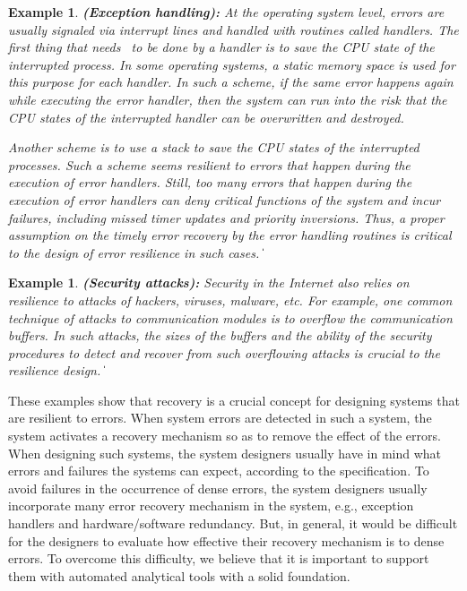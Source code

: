 \documentclass[times,10pt,twocolumn]{article}
\newtheorem{example}[theorem]{Example}
\newcommand\qed{\hfill\ensuremath{\Box}}
\def\qed{\ifmmode\|\else{\unskip\nobreak\hfil
\penalty50\hskip1em\null\nobreak\hfil$\blacksquare$
\parfillskip=0pt\finalhyphendemerits=0\endgraf}\fi}
\begin{document}
\begin{example} {\bf (Exception handling):} 
\label{exmp.ehan} 
At the operating system level, errors are usually signaled via 
interrupt lines and handled with routines called handlers.  
The first thing that needs~\label{reply2.needs.to} to be done by a handler is to save 
the CPU state of the interrupted process. 
In some operating systems, a static memory space is used for 
this purpose for each handler. 
In such a scheme, if the same error happens again while executing 
the error handler, then the system can run into the risk that 
the CPU states of the interrupted handler can be overwritten and 
destroyed. 

Another scheme is to use a stack to save the CPU states of the interrupted 
processes.  
Such a scheme seems resilient to errors that happen during\label{reply1.durin1} the execution of 
error handlers.  
Still, too many errors that happen during the execution of error handlers
can deny critical functions\label{reply2.delay.timely} of the system and 
incur failures, including missed timer updates and priority inversions.   
Thus, a proper assumption on the timely error recovery by 
the error handling routines is critical to the design of 
error resilience in such cases.  
\qed 
\end{example} 

\begin{example} {\bf (Security attacks):} 
\label{exmp.satt}
Security in the Internet also relies on resilience to attacks 
of hackers, viruses,\label{reply2.viruses} malware, etc.  
For example, one common technique of attacks\label{reply2.attacks} 
to communication modules is to 
overflow the communication buffers.  
In such attacks, the sizes\label{reply2.sizes} of the buffers and the ability 
of the security procedures to detect and recover 
from such overflowing attacks is crucial to the resilience design.  
\qed 
\end{example} 

These examples show that recovery is a crucial concept for\label{reply2.in2for} designing systems 
that are resilient to errors. 
When system errors are detected in such a system, 
the system activates a recovery mechanism so as to remove the effect of the errors. 
When designing such systems,\label{reply2.such.systems} the system designers usually
have in mind 
what errors and failures the systems can expect, according to the specification.  
\label{reply2.comparatively}
To avoid failures in the occurrence of dense errors, the system designers usually incorporate many error recovery mechanism 
in the system, e.g., exception handlers and hardware/software redundancy. 
But, in general, it would be difficult for the designers to evaluate 
how effective their recovery mechanism is to dense errors.  
To overcome this difficulty, we believe that it is important to 
support them with automated analytical tools with a solid foundation.  
\end{document}
